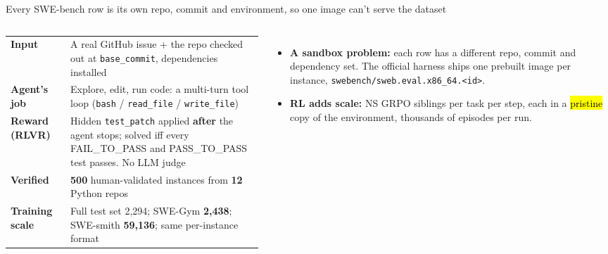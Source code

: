 
\begin{frame}{Every SWE-bench row is its own repo, commit and environment, so one image can't serve the dataset}
\begin{columns}[T]
\scriptsize
\begin{tabularx}{\linewidth}{@{}>{\bfseries}p{1.7cm}X@{}}
\toprule
Input & A real GitHub issue + the repo checked out at \texttt{base\_commit}, dependencies installed\\
Agent's job & Explore, edit, run code: a multi-turn tool loop (\texttt{bash} / \texttt{read\_file} / \texttt{write\_file})\\
Reward (RLVR) & Hidden \texttt{test\_patch} applied \textbf{after} the agent stops; solved iff every FAIL\_TO\_PASS and PASS\_TO\_PASS test passes. No LLM judge\\
Verified & \textbf{500} human-validated instances from \textbf{12} Python repos\\
Training scale & Full test set 2,294; SWE-Gym \textbf{2,438}; SWE-smith \textbf{59,136}; same per-instance format\\
\bottomrule
\end{tabularx}
\begin{itemize}\footnotesize\setlength{\itemsep}{1.5mm}
\item \textbf{A sandbox problem:} each row has a different repo, commit and dependency set. The official harness ships one prebuilt image per instance, \texttt{swebench/sweb.eval.x86\_64.<id>}.
\item \textbf{RL adds scale:} NS GRPO siblings per task per step, each in a \hl{pristine} copy of the environment, thousands of episodes per run.
\end{itemize}
\end{columns}
\end{frame}

